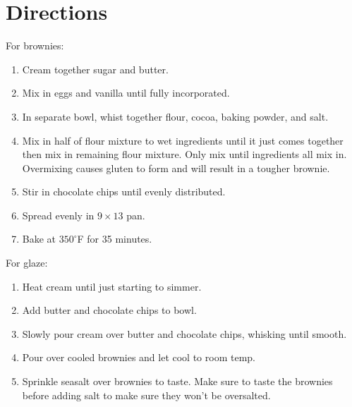 \documentclass{report}
\theoremstyle{plain} %
\theoremstyle{definition} %
\theoremstyle{plain} %
\begin{document}
\section*{Directions}
For brownies:
\begin{enumerate}
\item Cream together sugar and butter.
\item Mix in eggs and vanilla until fully incorporated.
\item In separate bowl, whist together flour, cocoa, baking powder, and salt.
\item Mix in half of flour mixture to wet ingredients until it just comes together then mix in remaining flour mixture. Only mix until ingredients all mix in. Overmixing causes gluten to form and will result in a tougher brownie.
\item Stir in chocolate chips until evenly distributed.
\item Spread evenly in $9\times 13$ pan.
\item Bake at $350^\circ$F for 35 minutes.
\end{enumerate}
For glaze:
\begin{enumerate}
\item Heat cream until just starting to simmer.
\item Add butter and chocolate chips to bowl.
\item Slowly pour cream over butter and chocolate chips, whisking until smooth.
\item Pour over cooled brownies and let cool to room temp.
\item Sprinkle seasalt over brownies to taste. Make sure to taste the brownies before adding salt to make sure they won't be oversalted.
\end{enumerate}
\end{document}
